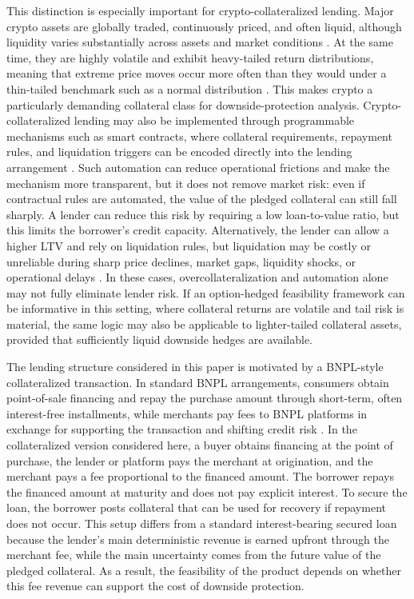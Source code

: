 \documentclass[11pt]{article}
\begin{document}
This distinction is especially important for crypto-collateralized lending. Major crypto assets are globally traded, continuously priced, and often liquid, although liquidity varies substantially across assets and market conditions \citep{wei_2018_liquidity}. At the same time, they are highly volatile and exhibit heavy-tailed return distributions, meaning that extreme price moves occur more often than they would under a thin-tailed benchmark such as a normal distribution \citep{katsiampa_2017_bitcoin, borri_2019_tailrisk}. This makes crypto a particularly demanding collateral class for downside-protection analysis. Crypto-collateralized lending may also be implemented through programmable mechanisms such as smart contracts, where collateral requirements, repayment rules, and liquidation triggers can be encoded directly into the lending arrangement \citep{chiu_2023_defi_fragility, cong_he_2019_smart_contracts}. Such automation can reduce operational frictions and make the mechanism more transparent, but it does not remove market risk: even if contractual rules are automated, the value of the pledged collateral can still fall sharply. A lender can reduce this risk by requiring a low loan-to-value ratio, but this limits the borrower’s credit capacity. Alternatively, the lender can allow a higher LTV and rely on liquidation rules, but liquidation may be costly or unreliable during sharp price declines, market gaps, liquidity shocks, or operational delays \citep{qin_2021_defi_liquidations, chiu_2023_defi_fragility}. In these cases, overcollateralization and automation alone may not fully eliminate lender risk. If an option-hedged feasibility framework can be informative in this setting, where collateral returns are volatile and tail risk is material, the same logic may also be applicable to lighter-tailed collateral assets, provided that sufficiently liquid downside hedges are available.

The lending structure considered in this paper is motivated by a BNPL-style collateralized transaction. In standard BNPL arrangements, consumers obtain point-of-sale financing and repay the purchase amount through short-term, often interest-free installments, while merchants pay fees to BNPL platforms in exchange for supporting the transaction and shifting credit risk \citep{cfpb_2022a_bnpl, cornelli_2023_bnpl, di_maggio_2022_bnpl}. In the collateralized version considered here, a buyer obtains financing at the point of purchase, the lender or platform pays the merchant at origination, and the merchant pays a fee proportional to the financed amount. The borrower repays the financed amount at maturity and does not pay explicit interest. To secure the loan, the borrower posts collateral that can be used for recovery if repayment does not occur. This setup differs from a standard interest-bearing secured loan because the lender’s main deterministic revenue is earned upfront through the merchant fee, while the main uncertainty comes from the future value of the pledged collateral. As a result, the feasibility of the product depends on whether this fee revenue can support the cost of downside protection.
\end{document}
